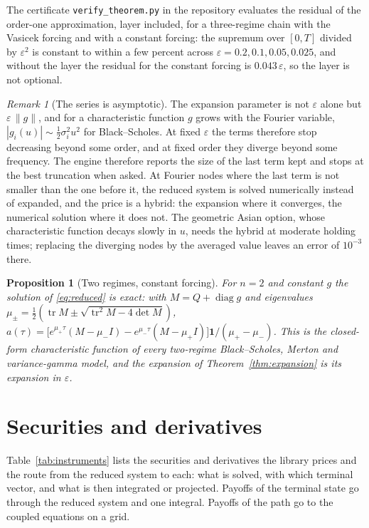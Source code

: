 \documentclass[11pt]{article}
\newtheorem{proposition}[theorem]{Proposition}
\theoremstyle{remark}
\newtheorem{remark}[theorem]{Remark}
\newcommand{\eps}{\varepsilon}
\newcommand{\diag}{\operatorname{diag}}
\begin{document}
The certificate
\texttt{verify\_theorem.py} in the repository evaluates the residual of the order-one approximation, layer included,
for a three-regime chain with the Vasicek forcing and with a constant forcing: the supremum over $[0,T]$ divided by
$\eps^2$ is constant to within a few percent across $\eps = 0.2, 0.1, 0.05, 0.025$, and without the layer the
residual for the constant forcing is $0.043\,\eps$, so the layer is not optional.

\begin{remark}[The series is asymptotic]
The expansion parameter is not $\eps$ alone but $\eps\,\|g\|$, and for a characteristic function $g$ grows with the
Fourier variable, $|g_i(u)| \sim \tfrac12\sigma_i^2 u^2$ for Black--Scholes. At fixed $\eps$ the terms therefore
stop decreasing beyond some order, and at fixed order they diverge beyond some frequency. The engine
therefore reports the size of the last term kept and stops at the best truncation when asked. At Fourier nodes
where the last term is not smaller than the one before it, the reduced system is solved numerically instead of
expanded, and the price is a hybrid: the expansion where it converges, the numerical solution where it does not.
The geometric Asian option, whose characteristic function decays slowly in $u$, needs the hybrid at moderate
holding times; replacing the diverging nodes by the averaged value leaves an error of $10^{-3}$ there.
\end{remark}

\begin{proposition}[Two regimes, constant forcing]
For $n = 2$ and constant $g$ the solution of \eqref{eq:reduced} is exact: with $M = Q + \diag g$ and
eigenvalues $\mu_\pm = \tfrac12(\operatorname{tr}M \pm \sqrt{\operatorname{tr}^2 M - 4\det M})$,
$a(\tau) = \big[e^{\mu_+\tau}(M - \mu_- I) - e^{\mu_-\tau}(M - \mu_+ I)\big]\mathbf 1/(\mu_+ - \mu_-)$.
This is the closed-form characteristic function of every two-regime Black--Scholes, Merton and variance-gamma
model, and the expansion of Theorem~\ref{thm:expansion} is its expansion in $\eps$.
\end{proposition}

\section{Securities and derivatives}
\label{sec:instruments}

Table~\ref{tab:instruments} lists the securities and derivatives the library prices and the route from the
reduced system to each: what is solved, with which terminal vector, and what is then integrated or projected.
Payoffs of the terminal state go through the reduced system and one integral. Payoffs of the path go to the
coupled equations on a grid.
\end{document}
